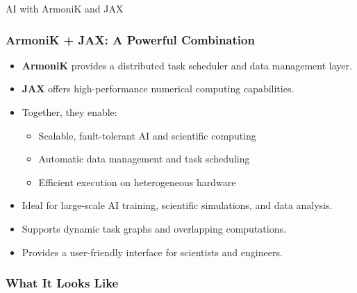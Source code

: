 \documentclass[10pt,aspectratio=1609]{beamer}
\begin{document}
\begin{section}{AI with ArmoniK and JAX}
 \begin{frame}
   \frametitle{ArmoniK + JAX: A Powerful Combination}
   \begin{itemize}
     \item \textbf{ArmoniK} provides a distributed task scheduler and data management layer.
     \item \textbf{JAX} offers high-performance numerical computing capabilities.
     \item Together, they enable:
           \begin{itemize}
             \item Scalable, fault-tolerant AI and scientific computing
             \item Automatic data management and task scheduling
             \item Efficient execution on heterogeneous hardware
           \end{itemize}
     \item Ideal for large-scale AI training, scientific simulations, and data analysis.
     \item Supports dynamic task graphs and overlapping computations.
     \item Provides a user-friendly interface for scientists and engineers.
   \end{itemize}
 \end{frame}

 \begin{frame}
   \frametitle{What It Looks Like}

 \end{frame}
\end{section}
\end{document}
